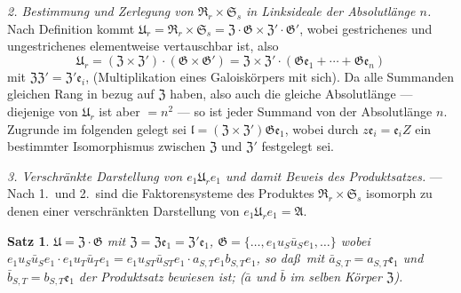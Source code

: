\documentclass[12pt,a4paper]{article}
\theoremstyle{plain}
\newtheorem{satz}{Satz}[section]
\theoremstyle{definition}
\theoremstyle{remark}
\begin{document}
\textit{2. Bestimmung und Zerlegung von $\mathfrak{R}_{r} \times \mathfrak{S}_{s}$ in
Linksideale der Absolutl\"ange $n$.} Nach Definition kommt
$\mathfrak{U}_{r} = \mathfrak{R}_{r} \times \mathfrak{S}_{s} = \mathfrak{Z} \cdot \mathfrak{G} \times \mathfrak{Z}' \cdot \mathfrak{G}'$,
wobei gestrichenes und ungestrichenes elementweise vertauschbar ist,
also
\[
\mathfrak{U}_{r} = (\mathfrak{Z} \times \mathfrak{Z}') \cdot (\mathfrak{G} \times \mathfrak{G}')
= \mathfrak{Z} \times \mathfrak{Z}' \cdot (\mathfrak{G}\mathfrak{e}_{1} + \cdots + \mathfrak{G}\mathfrak{e}_{n})
\]
mit $\mathfrak{Z}\mathfrak{Z}' = \mathfrak{Z}'\mathfrak{e}_{i}$, (Multiplikation eines
Galoisk\"orpers mit sich). Da alle Summanden gleichen Rang in bezug
auf $\mathfrak{Z}$ haben, also auch die gleiche Absolutl\"ange --- diejenige von
$\mathfrak{U}_{r}$ ist aber $=n^{2}$ --- so ist jeder Summand von der
Absolutl\"ange $n$. Zugrunde im folgenden gelegt sei
$\mathfrak{l} = (\mathfrak{Z} \times \mathfrak{Z}')\mathfrak{G}\mathfrak{e}_{1}$, wobei durch
$z\mathfrak{e}_{i} = \mathfrak{e}_{i}Z$ ein bestimmter Isomorphismus zwischen
$\mathfrak{Z}$ und $\mathfrak{Z}'$ festgelegt sei.

\textit{3. Verschr\"ankte Darstellung von $e_{1}\mathfrak{U}_{r}e_{1}$ und damit Beweis
des Produktsatzes.} --- Nach 1.\ und 2.\ sind die Faktorensysteme des
Produktes $\mathfrak{R}_{r} \times \mathfrak{S}_{s}$ isomorph zu denen einer
verschr\"ankten Darstellung von $e_{1}\mathfrak{U}_{r}e_{1} = \mathfrak{A}$.

\begin{satz}\label{satz:28-2}
$\mathfrak{U} = \mathfrak{Z} \cdot \mathfrak{G}$ mit $\mathfrak{Z} = \mathfrak{Z}\mathfrak{e}_{1} = \mathfrak{Z}'\mathfrak{e}_{1}$,
$\mathfrak{G} = \{\ldots, e_{1}u_{S}\bar{u}_{S}e_{1}, \ldots\}$ wobei
$e_{1}u_{S}\bar{u}_{S}e_{1} \cdot e_{1}u_{T}\bar{u}_{T}e_{1} =
e_{1}u_{ST}\bar{u}_{ST}e_{1} \cdot a_{S,T}e_{1}b_{S,T}e_{1}$,
so da\ss\ mit $\bar{a}_{S,T} = a_{S,T}\mathfrak{e}_{1}$ und
$\bar{b}_{S,T} = b_{S,T}\mathfrak{e}_{1}$ der Produktsatz bewiesen ist;
($\bar{a}$ und $\bar{b}$ im selben K\"orper $\mathfrak{Z}$).
\end{satz}
\end{document}
